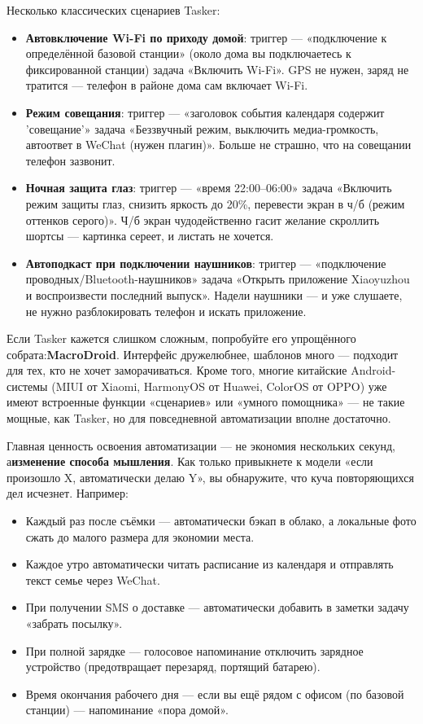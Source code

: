 Несколько классических сценариев Tasker:

\begin{itemize}
  \item \textbf{Автовключение Wi-Fi по приходу домой}: триггер — «подключение к определённой базовой станции» (около дома вы подключаетесь к фиксированной станции) задача «Включить Wi-Fi». GPS не нужен, заряд не тратится — телефон в районе дома сам включает Wi-Fi.
  \item \textbf{Режим совещания}: триггер — «заголовок события календаря содержит 'совещание'» задача «Беззвучный режим, выключить медиа-громкость, автоответ в WeChat (нужен плагин)». Больше не страшно, что на совещании телефон зазвонит.
  \item \textbf{Ночная защита глаз}: триггер — «время 22:00–06:00» задача «Включить режим защиты глаз, снизить яркость до 20\%, перевести экран в ч/б (режим оттенков серого)». Ч/б экран чудодейственно гасит желание скроллить шортсы — картинка сереет, и листать не хочется.
  \item \textbf{Автоподкаст при подключении наушников}: триггер — «подключение проводных/Bluetooth-наушников» задача «Открыть приложение Xiaoyuzhou и воспроизвести последний выпуск». Надели наушники — и уже слушаете, не нужно разблокировать телефон и искать приложение.
\end{itemize}

Если Tasker кажется слишком сложным, попробуйте его упрощённого собрата:\textbf{MacroDroid}. Интерфейс дружелюбнее, шаблонов много — подходит для тех, кто не хочет заморачиваться. Кроме того, многие китайские Android-системы (MIUI от Xiaomi, HarmonyOS от Huawei, ColorOS от OPPO) уже имеют встроенные функции «сценариев» или «умного помощника» — не такие мощные, как Tasker, но для повседневной автоматизации вполне достаточно.


Главная ценность освоения автоматизации — не экономия нескольких секунд, а\textbf{изменение способа мышления}. Как только привыкнете к модели «если произошло X, автоматически делаю Y», вы обнаружите, что куча повторяющихся дел исчезнет. Например:

\begin{itemize}
  \item Каждый раз после съёмки — автоматически бэкап в облако, а локальные фото сжать до малого размера для экономии места.
  \item Каждое утро автоматически читать расписание из календаря и отправлять текст семье через WeChat.
  \item При получении SMS о доставке — автоматически добавить в заметки задачу «забрать посылку».
  \item При полной зарядке — голосовое напоминание отключить зарядное устройство (предотвращает перезаряд, портящий батарею).
  \item Время окончания рабочего дня — если вы ещё рядом с офисом (по базовой станции) — напоминание «пора домой».
\end{itemize}


